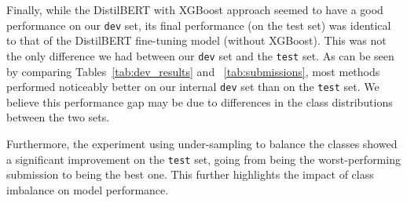 \documentclass[11pt]{article}
\begin{document}
\begin{table}[t!]
\centering
{}
  \caption{\label{tab:team_performance_deltas} Performance difference between our best submissions and the winners, for each task. This table was built based on the \textit{team results}, so the total number of submissions for each track is always fewer than those considered in Table~\ref{tab:submissions}.}
\end{table}


Finally, while the DistilBERT with XGBoost approach seemed to have a good performance on our \texttt{dev} set, its final performance (on the test set) was identical to that of the DistilBERT fine-tuning model (without XGBoost).
This was not the only difference we had between our \texttt{dev} set and the \texttt{test} set.
As can be seen by comparing Tables~\ref{tab:dev_results} and ~\ref{tab:submissions}, most methods performed noticeably better on our internal \texttt{dev} set than on the \texttt{test} set.
We believe this performance gap may be due to differences in the class distributions between the two sets.

Furthermore, the experiment using under-sampling to balance the classes showed a significant improvement on the \texttt{test} set, going from being the worst-performing submission to being the best one.
This further highlights the impact of class imbalance on model performance.
\end{document}

